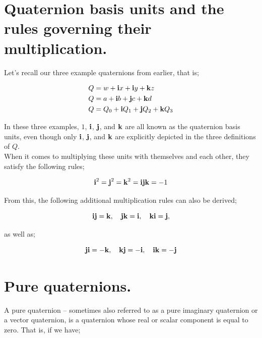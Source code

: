 \section{Quaternion basis units and the rules governing their multiplication.}

Let's recall our three example quaternions from earlier, that is;

\begin{align*}
Q & = w   + \bm{\mathrm{i}} x   + \bm{\mathrm{i}} y   + \bm{\mathrm{k}} z  \\
Q & = a   + \bm{\mathrm{i}} b   + \bm{\mathrm{j}} c   + \bm{\mathrm{k}} d  \\
Q & = Q_0 + \bm{\mathrm{i}} Q_1 + \bm{\mathrm{j}} Q_2 + \bm{\mathrm{k}} Q_3
\end{align*}
\vspace{0.0\baselineskip}

In these three examples, \(1\), \(\bm{\mathrm{i}}\), \(\bm{\mathrm{j}}\), and \(\bm{\mathrm{k}}\) are all known as the quaternion basis units,
even though only \(\bm{\mathrm{i}}\), \(\bm{\mathrm{j}}\), and \(\bm{\mathrm{k}}\) are explicitly depicted in the three definitions of \(Q\). \\

When it comes to multiplying these units with themselves and each other, they satisfy the following rules;

\begin{equation*}
\bm{\mathrm{i}}^2=\bm{\mathrm{j}}^2=\bm{\mathrm{k}}^2=\bm{\mathrm{ijk}}=-1
\end{equation*}
\vspace{0.0\baselineskip}

From this, the following additional multiplication rules can also be derived;

\begin{equation*}
\bm{\mathrm{ij}}=\bm{\mathrm{k}},\quad \bm{\mathrm{jk}}=\bm{\mathrm{i}},\quad \bm{\mathrm{ki}}=\bm{\mathrm{j}},
\end{equation*}

as well as;

\begin{equation*}
\bm{\mathrm{ji}}=-\bm{\mathrm{k}}, \quad \bm{\mathrm{kj}}=-\bm{\mathrm{i}},\quad \bm{\mathrm{ik}}=-\bm{\mathrm{j}}
\end{equation*}


\section{Pure quaternions.}

A pure quaternion -- sometimes also referred to as a pure imaginary quaternion or a vector quaternion, is a quaternion
whose real or scalar component is equal to zero. That is, if we have;

